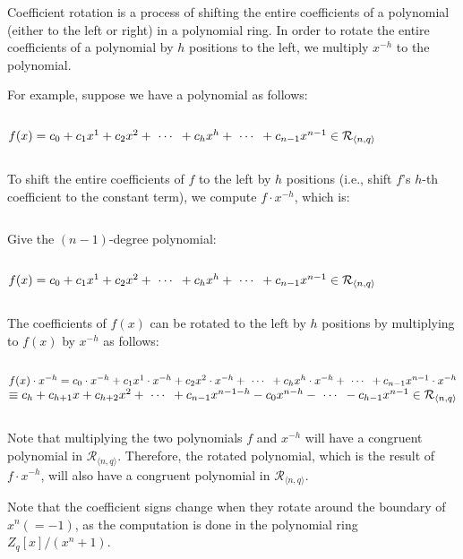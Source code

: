 Coefficient rotation is a process of shifting the entire coefficients of a polynomial (either to the left or right) in a polynomial ring. In order to rotate the entire coefficients of a polynomial by $h$ positions to the left, we multiply $x^{-h}$ to the polynomial. 

For example, suppose we have a polynomial as follows:

$ $

$f(x) = c_0 + c_1x^1 + c_2x^2 + \text{ } \text{$\cdots$} \text{ } + c_hx^h + \text{ } \text{$\cdots$} \text{ } + c_{n-1}x^{n-1} \in \mathcal{R}_{\langle n, q \rangle}$

$ $

To shift the entire coefficients of $f$ to the left by $h$ positions (i.e., shift $f$'s $h$-th coefficient to the constant term), we compute $f \cdot x^{-h}$, which is:

$ $

\begin{tcolorbox}[title={\textbf{\tboxlabel{\ref*{subsec:coeff-rotation}} Polynomial Rotation}}]

Give the $(n-1)$-degree polynomial: 

$ $

$f(x) = c_0 + c_1x^1 + c_2x^2 + \text{ } \text{$\cdots$} \text{ } + c_hx^h + \text{ } \text{$\cdots$} \text{ } + c_{n-1}x^{n-1} \in \mathcal{R}_{\langle n, q \rangle}$

$ $

The coefficients of $f(x)$ can be rotated to the left by $h$ positions by multiplying to $f(x)$ by $x^{-h}$ as follows:

$ $

$f(x) \cdot x^{-h} = c_0\cdot x^{-h} + c_1x^1 \cdot x^{-h} + c_2x^2 \cdot x^{-h} + \text{ } \text{$\cdots$} \text{ } + c_hx^h \cdot x^{-h} + \text{ } \text{$\cdots$} \text{ } + c_{n-1}x^{n-1} \cdot x^{-h}$
$\equiv c_h + c_{h+1}x + c_{h+2}x^2 + \text{ } \text{$\cdots$} \text{ } + c_{n-1}x^{n-1-h} - c_0x^{n - h} - \text{ } \text{$\cdots$} \text{ } - c_{h-1}x^{n-1} \in \mathcal{R}_{\langle n, q \rangle}$
\end{tcolorbox}

$ $

Note that multiplying the two polynomials $f$ and $x^{-h}$ will have a congruent polynomial in $\mathcal{R}_{\langle n, q \rangle}$. Therefore, the rotated polynomial, which is the result of $f \cdot x^{-h}$, will also have a congruent polynomial in $\mathcal{R}_{\langle n, q \rangle}$. 

Note that the coefficient signs change when they rotate around the boundary of $x^n (= -1)$, as the computation is done in the polynomial ring $Z_q[x] / (x^n + 1)$.




